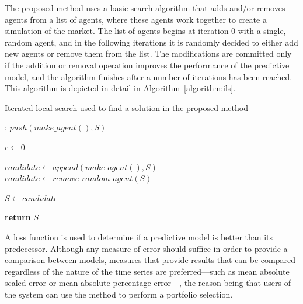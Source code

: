 ﻿\documentclass{ieeeaccess}
\begin{document}
The proposed method uses a basic search algorithm that adds and/or removes
agents from a list of agents, where these agents work together to create a
simulation of the market. The list of agents begins at iteration 0 with a
single, random agent, and in the following iterations it is randomly decided to either
add new agents or remove them from the list. The modifications are committed
only if the addition or removal operation improves the performance of the
predictive model, and the algorithm finishes after a number of iterations
has been reached. %
This algorithm is depicted in detail in
Algorithm~\ref{algorithm:ils}.

\begin{algorithm}
  \caption{Iterated local search used to find a solution in the proposed method}
  \label{algorithm:ils}
  \begin{algorithmic}[1]
    ;
    \State $push(make\_agent(), S)$ %

    \State $c \gets 0$

    \State $candidate \gets append(make\_agent(), S)$
    \Else
    \State $candidate \gets remove\_random\_agent(S)$
    \EndIf

    \State $S \gets candidate$
    \EndIf
    
    \EndWhile

    \State \textbf{return} $S$
    \EndProcedure
  \end{algorithmic}
\end{algorithm}

A loss function is used to determine if a predictive model is better than
its predecessor. Although any measure of error should suffice in order to provide a
comparison between models, measures that provide results that can be compared
regardless of the nature of the time series are preferred---such as mean
absolute scaled error or mean absolute percentage error---, the reason being that
users of the system can use the method to perform a portfolio selection.
\end{document}
